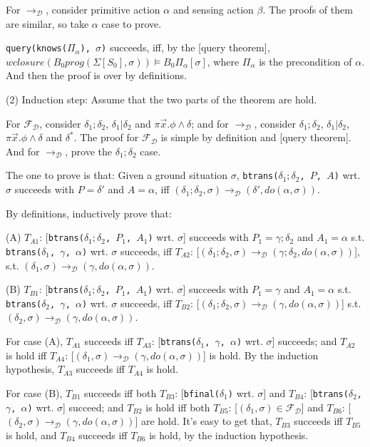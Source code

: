 \documentclass[letterpaper]{article}
\begin{document}
For $\rightarrow_\mathcal{D}$, consider primitive action $\alpha$ and sensing action $\beta$. The proofs of them are similar, so take $\alpha$ case to prove.

\texttt{query(knows($\Pi_\alpha$), $\sigma$)} succeeds, iff, by the [query theorem], $wclosure(B_0 prog(\Sigma[S_0], \sigma))\models B_0 \Pi_\alpha[\sigma]$, where $\Pi_\alpha$ is the precondition of $\alpha$. And then the proof is over by definitions.

(2) Induction step: Assume that the two parts of the theorem are hold.

For $\mathcal{F_D}$, consider $\delta_1;\delta_2$, $\delta_1|\delta_2$ and $\pi\vec{x}.\phi\wedge\delta$; and for $\rightarrow_\mathcal{D}$, consider $\delta_1;\delta_2$, $\delta_1|\delta_2$, $\pi\vec{x}.\phi\wedge\delta$ and $\delta^*$. The proof for $\mathcal{F_D}$ is simple by definition and [query theorem]. And for $\rightarrow_\mathcal{D}$, prove the $\delta_1;\delta_2$ case.

The one to prove is that: Given a ground situation $\sigma$,
\texttt{btrans($\delta_1;\delta_2$, $P$, $A$)} wrt. $\sigma$ succeeds with $P=\delta'$ and $A=\alpha$, iff
$(\delta_1;\delta_2,\sigma)\rightarrow_\mathcal{D}(\delta',do(\alpha,\sigma))$.

By definitions, inductively prove that:

(A) $T_{A1}$: [\texttt{btrans($\delta_1;\delta_2$, $P_1$, $A_1$)} wrt. $\sigma$] succeeds with $P_1=\gamma;\delta_2$ and $A_1=\alpha$
s.t. \texttt{btrans($\delta_1$, $\gamma$, $\alpha$)} wrt. $\sigma$ succeeds, iff
$T_{A2}$: [$(\delta_1;\delta_2,\sigma)\rightarrow_\mathcal{D}(\gamma;\delta_2,do(\alpha,\sigma))$],
s.t. $(\delta_1,\sigma)\rightarrow_\mathcal{D}(\gamma,do(\alpha,\sigma))$.

(B) $T_{B1}$: [\texttt{btrans($\delta_1;\delta_2$, $P_1$, $A_1$)} wrt. $\sigma$] succeeds with $P_1=\gamma$ and $A_1=\alpha$
s.t. \texttt{btrans($\delta_2$, $\gamma$, $\alpha$)} wrt. $\sigma$ succeeds, iff
$T_{B2}$: [$(\delta_1;\delta_2,\sigma)\rightarrow_\mathcal{D}(\gamma,do(\alpha,\sigma))$]
s.t. $(\delta_2,\sigma)\rightarrow_\mathcal{D}(\gamma,do(\alpha,\sigma))$.

For case (A), $T_{A1}$ succeeds iff $T_{A3}$: [\texttt{btrans($\delta_1$, $\gamma$, $\alpha$)} wrt. $\sigma$] succeeds;
and $T_{A2}$ is hold iff $T_{A4}$: [$(\delta_1,\sigma)\rightarrow_\mathcal{D}(\gamma,do(\alpha,\sigma))$] is hold.
By the induction hypothesis, $T_{A3}$ succeeds iff $T_{A4}$ is hold.

For case (B), $T_{B1}$ succeeds iff both $T_{B3}$: [\texttt{bfinal($\delta_1$)} wrt. $\sigma$] and $T_{B4}$: [\texttt{btrans($\delta_2$, $\gamma$, $\alpha$)} wrt. $\sigma$] succeed;
and $T_{B2}$ is hold iff both $T_{B5}$: [$(\delta_1,\sigma)\in \mathcal{F_D}$] and $T_{B6}$:
[$(\delta_2,\sigma)\rightarrow_\mathcal{D}(\gamma,do(\alpha,\sigma))$] are hold.
It's easy to get that, $T_{B3}$ succeeds iff $T_{B5}$ is hold, and $T_{B4}$ succeeds iff $T_{B6}$ is hold, by the induction hypothesis.
\end{document}
